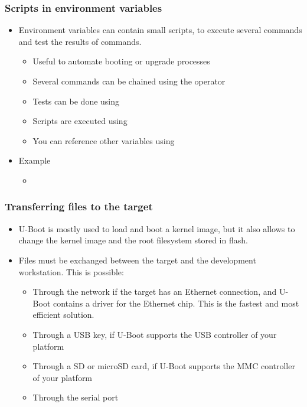 \begin{frame}
  \frametitle{Scripts in environment variables}
  \begin{itemize}
  \item Environment variables can contain small scripts, to execute
    several commands and test the results of commands.
    \begin{itemize}
    \item Useful to automate booting or upgrade processes
    \item Several commands can be chained using the \code{;} operator
    \item Tests can be done using
    \item Scripts are executed using 
    \item You can reference other variables using
    \end{itemize}
  \item Example
    \begin{itemize}
    \item {}
  \end{itemize}
\end{itemize}
\end{frame}

\begin{frame}
  \frametitle{Transferring files to the target}
  \begin{itemize}
  \item U-Boot is mostly used to load and boot a kernel image, but it
    also allows to change the kernel image and the root filesystem
    stored in flash.
  \item Files must be exchanged between the target and the development
    workstation. This is possible:
    \begin{itemize}
    \item Through the network if the target has an Ethernet
      connection, and U-Boot contains a driver for the Ethernet
      chip. This is the fastest and most efficient solution.
    \item Through a USB key, if U-Boot supports the USB controller of
      your platform
    \item Through a SD or microSD card, if U-Boot supports the MMC
      controller of your platform
    \item Through the serial port
    \end{itemize}
  \end{itemize}
\end{frame}

